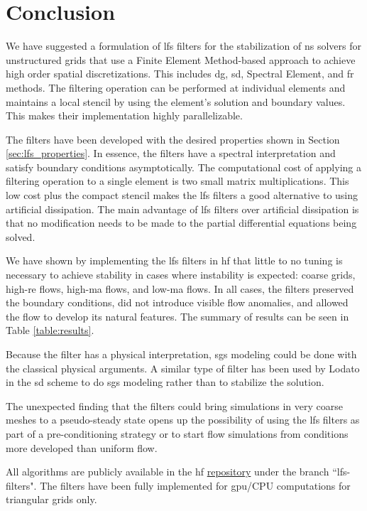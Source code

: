 \section{Conclusion}
\label{sec:conclusion}

We have suggested a formulation of \gls{lfs} filters for the stabilization of \gls{ns} solvers for unstructured grids that use a Finite Element Method-based approach to achieve high order spatial discretizations. This includes \gls{dg}, \gls{sd}, Spectral Element, and \gls{fr} methods. The filtering operation can be performed at individual elements and maintains a local stencil by using the element's solution and boundary values. This makes their implementation highly parallelizable.

The filters have been developed with the desired properties shown in Section \ref{sec:lfs_properties}. In essence, the filters have a spectral interpretation and satisfy boundary conditions asymptotically. The computational cost of applying a filtering operation to a single element is two small matrix multiplications. This low cost plus the compact stencil makes the \gls{lfs} filters a good alternative to using artificial dissipation. The main advantage of \gls{lfs} filters over artificial dissipation is that no modification needs to be made to the partial differential equations being solved.

We have shown by implementing the \gls{lfs} filters in \gls{hf} that little to no tuning is necessary to achieve stability in cases where instability is expected: coarse grids, high-\gls{re} flows, high-\gls{ma} flows, and low-\gls{ma} flows. In all cases, the filters preserved the boundary conditions, did not introduce visible flow anomalies, and allowed the flow to develop its natural features. The summary of results can be seen in Table \ref{table:results}.

Because the filter has a physical interpretation, \gls{sgs} modeling could be done with the classical physical arguments. A similar type of filter has been used by Lodato\cite{lodato2014structural} in the \gls{sd} scheme to do \gls{sgs} modeling rather than to stabilize the solution.

The unexpected finding that the filters could bring simulations in very coarse meshes to a pseudo-steady state opens up the possibility of using the \gls{lfs} filters as part of a pre-conditioning strategy or to start flow simulations from conditions more developed than uniform flow.

All algorithms are publicly available in the \gls{hf} \href{https://github.com/HiFiLES/HiFiLES-solver}{repository} under the branch ``\gls{lfs}-filters". The filters have been fully implemented for \gls{gpu}/CPU computations for triangular grids only.

%